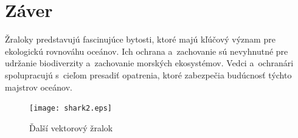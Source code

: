 \documentclass{artikel1}
\begin{document}
\section{Záver}
Žraloky predstavujú fascinujúce bytosti, ktoré majú kľúčový význam pre ekologickú rovnováhu oceánov. Ich ochrana a~zachovanie sú nevyhnutné pre udržanie biodiverzity a~zachovanie morských ekosystémov. Vedci a~ochranári spolupracujú s~cieľom presadiť opatrenia, ktoré zabezpečia budúcnosť týchto majstrov oceánov.

\printbibliography[heading=bibintoc]

\printindex
\begin{figure}
  \begin{center}
  \texttt{[image: shark2.eps]}
  \caption{Ďalší vektorový žralok}
  \label{shark2}
  \end{center}
\end{figure}
\end{document}
